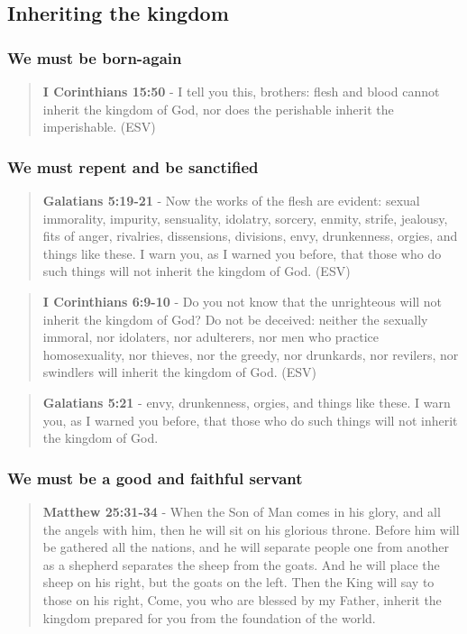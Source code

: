 \documentclass[11pt]{article}
\begin{document}
\subsection{Inheriting the kingdom}
\label{sec:orgb8d7997}
\subsubsection{We must be born-again}
\label{sec:orgb052160}
\begin{quote}
\textbf{I Corinthians 15:50} - I tell you this, brothers: flesh and blood cannot inherit the kingdom of God, nor does the perishable inherit the imperishable. (ESV)
\end{quote}

\subsubsection{We must repent and be sanctified}
\label{sec:orga69f2ff}
\begin{quote}
\textbf{Galatians 5:19-21} -  Now the works of the flesh are evident: sexual immorality, impurity, sensuality, idolatry, sorcery, enmity, strife, jealousy, fits of anger, rivalries, dissensions, divisions, envy, drunkenness, orgies, and things like these.  I warn you, as I warned you before, that those who do such things will not inherit the kingdom of God. (ESV)
\end{quote}

\begin{quote}
\textbf{I Corinthians 6:9-10} - Do you not know that the unrighteous will not inherit the kingdom of God? Do not be deceived: neither the sexually immoral, nor idolaters, nor adulterers, nor men who practice homosexuality, nor thieves, nor the greedy, nor drunkards, nor revilers, nor swindlers will inherit the kingdom of God. (ESV)
\end{quote}

\begin{quote}
\textbf{Galatians 5:21} - envy, drunkenness, orgies, and things like these. I warn you, as I warned you before, that those who do such things will not inherit the kingdom of God.
\end{quote}

\subsubsection{We must be a good and faithful servant}
\label{sec:orgcbc7540}
\begin{quote}
\textbf{Matthew 25:31-34} - When the Son of Man comes in his glory, and all the angels with him, then he will sit on his glorious throne. Before him will be gathered all the nations, and he will separate people one from another as a shepherd separates the sheep from the goats. And he will place the sheep on his right, but the goats on the left. Then the King will say to those on his right, Come, you who are blessed by my Father, inherit the kingdom prepared for you from the foundation of the world.
\end{quote}
\end{document}
